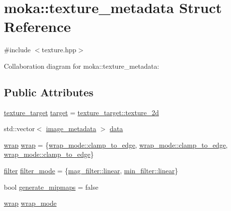 \hypertarget{structmoka_1_1texture__metadata}{}\section{moka\+::texture\+\_\+metadata Struct Reference}
\label{structmoka_1_1texture__metadata}


{\ttfamily \#include $<$texture.\+hpp$>$}



Collaboration diagram for moka\+::texture\+\_\+metadata\+:
\subsection*{Public Attributes}
\begin{DoxyCompactItemize}
\item 
\mbox{\hyperlink{namespacemoka_a259bf395c8f07bd8d13515efcb542623}{texture\+\_\+target}} \mbox{\hyperlink{structmoka_1_1texture__metadata_ae1bfa5eb2e497752ceb17771b5f726d4}{target}} = \mbox{\hyperlink{namespacemoka_a259bf395c8f07bd8d13515efcb542623ade86992194d08494a0a0e208a3660f31}{texture\+\_\+target\+::texture\+\_\+2d}}
\item 
std\+::vector$<$ \mbox{\hyperlink{structmoka_1_1image__metadata}{image\+\_\+metadata}} $>$ \mbox{\hyperlink{structmoka_1_1texture__metadata_a3630e894018dc21eb1df6a991b7e140f}{data}}
\item 
\mbox{\hyperlink{structmoka_1_1wrap}{wrap}} \mbox{\hyperlink{structmoka_1_1texture__metadata_a748e2dbf4726ea803d5fc521ca809d8e}{wrap}} = \{\mbox{\hyperlink{namespacemoka_afda3faa87bacaacc6008d8c1f73f6462a7ff5ead6fef18ca5f63119754ac76c3e}{wrap\+\_\+mode\+::clamp\+\_\+to\+\_\+edge}}, \mbox{\hyperlink{namespacemoka_afda3faa87bacaacc6008d8c1f73f6462a7ff5ead6fef18ca5f63119754ac76c3e}{wrap\+\_\+mode\+::clamp\+\_\+to\+\_\+edge}}, \mbox{\hyperlink{namespacemoka_afda3faa87bacaacc6008d8c1f73f6462a7ff5ead6fef18ca5f63119754ac76c3e}{wrap\+\_\+mode\+::clamp\+\_\+to\+\_\+edge}}\}
\item 
\mbox{\hyperlink{structmoka_1_1filter}{filter}} \mbox{\hyperlink{structmoka_1_1texture__metadata_a7192a54869133445f71ac0e8ddb3b3e4}{filter\+\_\+mode}} = \{\mbox{\hyperlink{namespacemoka_a2391e4ae99494b70d0226ee0e586f33ca9a932b3cb396238423eb2f33ec17d6aa}{mag\+\_\+filter\+::linear}}, \mbox{\hyperlink{namespacemoka_a2391e4ae99494b70d0226ee0e586f33ca9a932b3cb396238423eb2f33ec17d6aa}{min\+\_\+filter\+::linear}}\}
\item 
bool \mbox{\hyperlink{structmoka_1_1texture__metadata_a8c4194db5c2141604e49cbbc1737312a}{generate\+\_\+mipmaps}} = false
\item 
\mbox{\hyperlink{structmoka_1_1wrap}{wrap}} \mbox{\hyperlink{structmoka_1_1texture__metadata_ab21e86d7633933cd69cf73c2df3a497d}{wrap\+\_\+mode}}
\end{DoxyCompactItemize}


